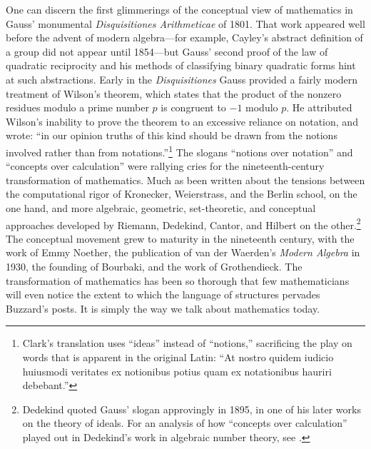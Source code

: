 \documentclass[12pt]{amsart}
\theoremstyle{definition}
\theoremstyle{remark}
\numberwithin{equation}{section}
\begin{document}
One can discern the first glimmerings of the conceptual view of mathematics in Gauss' monumental \emph{Disquisitiones Arithmeticae} of 1801. That work appeared well before the advent of modern algebra---for example, Cayley's abstract definition of a group did not appear until 1854---but Gauss' second proof of the law of quadratic reciprocity and his methods of classifying binary quadratic forms hint at such abstractions. Early in the \emph{Disquisitiones} Gauss provided a fairly modern treatment of Wilson's theorem, which states that the product of the nonzero residues modulo a prime number $p$ is congruent to $-1$ modulo $p$. He attributed Wilson's inability to prove the theorem to an excessive reliance on notation, and wrote: ``in our opinion truths of this kind should be drawn from the notions involved rather than from notations.''\footnote{Clark's translation \cite[Section 76]{gauss:disquisitiones:arithmeticae} uses ``ideas'' instead of ``notions,'' sacrificing the play on words that is apparent in the original Latin: ``At nostro quidem iudicio huiusmodi veritates ex notionibus potius quam ex notationibus hauriri debebant.''} The slogans ``notions over notation'' and ``concepts over calculation'' were rallying cries for the nineteenth-century transformation of mathematics. Much as been written about the tensions between the computational rigor of Kronecker, Weierstrass, and the Berlin school, on the one hand, and more algebraic, geometric, set-theoretic, and conceptual approaches developed by Riemann, Dedekind, Cantor, and Hilbert on the other.\footnote{Dedekind quoted Gauss' slogan approvingly in 1895, in one of his later works on the theory of ideals. For an analysis of how ``concepts over calculation'' played out in Dedekind's work in algebraic number theory, see \cite{avigad:06}.} The conceptual movement grew to maturity in the nineteenth century, with the work of Emmy Noether, the publication of van der Waerden's \emph{Modern Algebra} in 1930, the founding of Bourbaki, and the work of Grothendieck. The transformation of mathematics has been so thorough that few mathematicians will even notice the extent to which the language of structures pervades Buzzard's posts. It is simply the way we talk about mathematics today.
\end{document}
